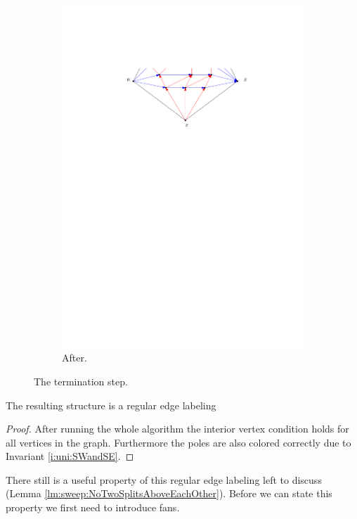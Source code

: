 \begin{figure}[h]
\begin{subfigure}[b]{0.45 \textwidth}
        \includegraphics[width =\textwidth]{unifiedAlgo/img/sweep/terminateAfter.pdf}
        \caption{After.}
    \end{subfigure}
    \caption{The termination step.}
    \label{fig:sweep:terminate}
  \end{figure}

  \begin{lemma}
    \label{lm:sweep:REL}
    The resulting structure is a regular edge labeling
  \end{lemma}

  \begin{proof}
    After running the whole algorithm the interior vertex condition holds for all vertices in the graph. Furthermore the poles are also colored correctly due to Invariant \ref{i:uni:SWandSE}.
  \end{proof}


    There still is a useful property of this regular edge labeling left to discuss (Lemma \ref{lm:sweep:NoTwoSplitsAboveEachOther}). Before we can state this property we first need to introduce fans.


